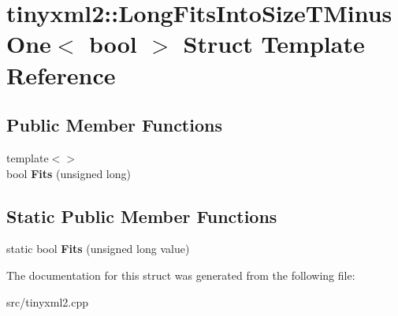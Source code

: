 \hypertarget{structtinyxml2_1_1_long_fits_into_size_t_minus_one}{}\section{tinyxml2\+:\+:Long\+Fits\+Into\+Size\+T\+Minus\+One$<$ bool $>$ Struct Template Reference}
\label{structtinyxml2_1_1_long_fits_into_size_t_minus_one}
\subsection*{Public Member Functions}
\begin{DoxyCompactItemize}
\item 
{\footnotesize template$<$$>$ }\\bool {\bfseries Fits} (unsigned long)\hypertarget{structtinyxml2_1_1_long_fits_into_size_t_minus_one_a85fb9734fefa25d130ea831f683fc444}{}\label{structtinyxml2_1_1_long_fits_into_size_t_minus_one_a85fb9734fefa25d130ea831f683fc444}

\end{DoxyCompactItemize}
\subsection*{Static Public Member Functions}
\begin{DoxyCompactItemize}
\item 
static bool {\bfseries Fits} (unsigned long value)\hypertarget{structtinyxml2_1_1_long_fits_into_size_t_minus_one_a3057710104ab733963eb32fda0bc374c}{}\label{structtinyxml2_1_1_long_fits_into_size_t_minus_one_a3057710104ab733963eb32fda0bc374c}

\end{DoxyCompactItemize}


The documentation for this struct was generated from the following file\+:\begin{DoxyCompactItemize}
\item 
src/tinyxml2.\+cpp\end{DoxyCompactItemize}
